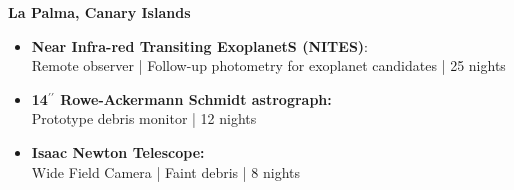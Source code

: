 \medskip


\normalsize \textbf{La Palma, Canary Islands}

\medskip

\begin{itemize}
\item \small \textbf{Near Infra-red Transiting ExoplanetS (NITES)}: \\
Remote observer | Follow-up photometry for exoplanet candidates | 25 nights
\item \small \textbf{14$^{\prime\prime}$ Rowe-Ackermann Schmidt astrograph:} \\
Prototype debris monitor | 12 nights
\item \small \textbf{Isaac Newton Telescope:} \\
Wide Field Camera | Faint debris | 8 nights
\end{itemize}
